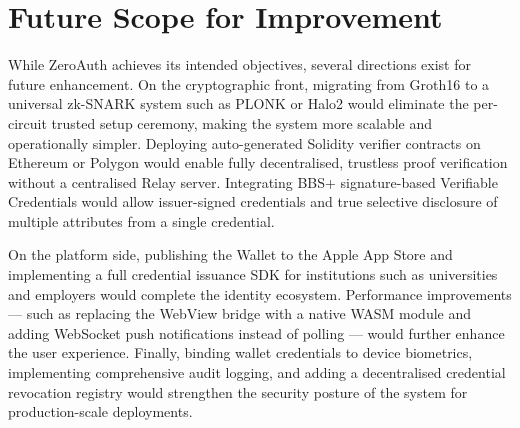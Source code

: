 \newpage
\section{Future Scope for Improvement}

While ZeroAuth achieves its intended objectives, several directions exist for future enhancement. On the cryptographic front, migrating from Groth16 to a universal zk-SNARK system such as PLONK or Halo2 would eliminate the per-circuit trusted setup ceremony, making the system more scalable and operationally simpler. Deploying auto-generated Solidity verifier contracts on Ethereum or Polygon would enable fully decentralised, trustless proof verification without a centralised Relay server. Integrating BBS+ signature-based Verifiable Credentials would allow issuer-signed credentials and true selective disclosure of multiple attributes from a single credential.

On the platform side, publishing the Wallet to the Apple App Store and implementing a full credential issuance SDK for institutions such as universities and employers would complete the identity ecosystem. Performance improvements --- such as replacing the WebView bridge with a native WASM module and adding WebSocket push notifications instead of polling --- would further enhance the user experience. Finally, binding wallet credentials to device biometrics, implementing comprehensive audit logging, and adding a decentralised credential revocation registry would strengthen the security posture of the system for production-scale deployments.

